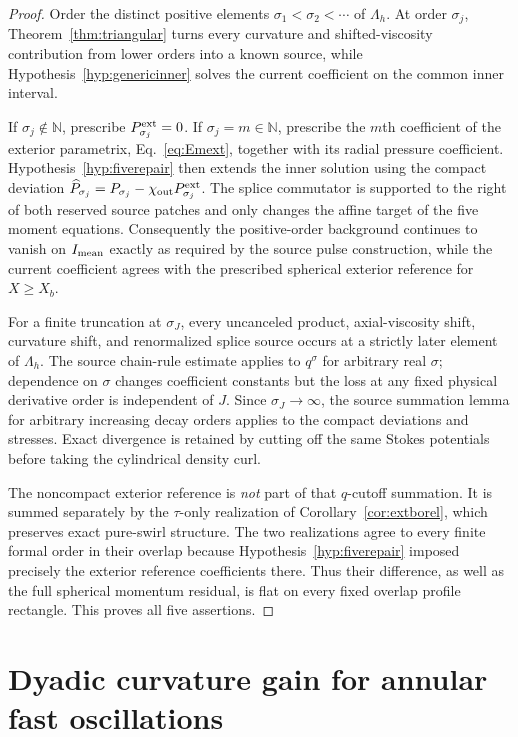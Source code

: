 \documentclass[aps,prd,reprint,superscriptaddress,nofootinbib,floatfix]{revtex4-2}
\theoremstyle{definition}
\theoremstyle{remark}
\newcommand{\Lam}{\Lambda_h}
\begin{document}
\begin{proof}
	Order the distinct positive elements $\sigma_1<\sigma_2<\cdots$ of $\Lam$.  At order $\sigma_j$, Theorem~\ref{thm:triangular} turns every curvature and shifted-viscosity contribution from lower orders into a known source, while Hypothesis~\ref{hyp:genericinner} solves the current coefficient on the common inner interval.

	If $\sigma_j\notin\mathbb N$, prescribe $P_{\sigma_j}^{\rm ext}=0$.  If $\sigma_j=m\in\mathbb N$, prescribe the $m$th coefficient of the exterior parametrix, Eq.~\eqref{eq:Emext}, together with its radial pressure coefficient.  Hypothesis~\ref{hyp:fiverepair} then extends the inner solution using the compact deviation $\widehat P_{\sigma_j}=P_{\sigma_j}-\chi_{\rm out}P_{\sigma_j}^{\rm ext}$.  The splice commutator is supported to the right of both reserved source patches and only changes the affine target of the five moment equations.  Consequently the positive-order background continues to vanish on $I_{\rm mean}$ exactly as required by the source pulse construction, while the current coefficient agrees with the prescribed spherical exterior reference for $X\ge X_b$.

	For a finite truncation at $\sigma_J$, every uncanceled product, axial-viscosity shift, curvature shift, and renormalized splice source occurs at a strictly later element of $\Lam$.  The source chain-rule estimate applies to $q^\sigma$ for arbitrary real $\sigma$; dependence on $\sigma$ changes coefficient constants but the loss at any fixed physical derivative order is independent of $J$.  Since $\sigma_J\to\infty$, the source summation lemma for arbitrary increasing decay orders applies to the compact deviations and stresses.  Exact divergence is retained by cutting off the same Stokes potentials before taking the cylindrical density curl.

	The noncompact exterior reference is \emph{not} part of that $q$-cutoff summation.  It is summed separately by the $\tau$-only realization of Corollary~\ref{cor:extborel}, which preserves exact pure-swirl structure.  The two realizations agree to every finite formal order in their overlap because Hypothesis~\ref{hyp:fiverepair} imposed precisely the exterior reference coefficients there.  Thus their difference, as well as the full spherical momentum residual, is flat on every fixed overlap profile rectangle.  This proves all five assertions.
\end{proof}


\section{Dyadic curvature gain for annular fast oscillations}\label{sec:fast}
\end{document}
